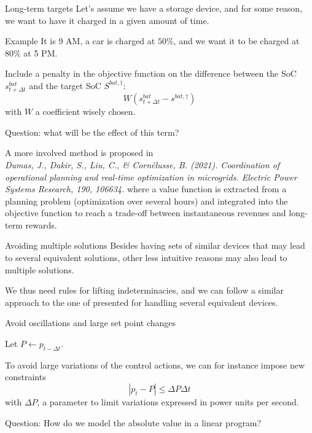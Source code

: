 \begin{frame}[allowframebreaks]{Long-term targets}
    Let's assume we have a storage device, and for some reason, we want to have it charged in a given amount of time.
    \begin{block}{Example}
        It is 9 AM, a car is charged at $50\%$, and we want it to be charged at $80\%$ at 5 PM.
    \end{block}

    Include a penalty in the objective function on the difference between the SoC $s^{bat}_{t+\Delta t}$ and the target SoC $S^{bat, \dagger}$:
    $$W (s^{bat}_{t+\Delta t} - s^{bat, \dagger})$$
    with $W$ a coefficient wisely chosen.

    Question: what will be the effect of this term?

    A more involved method is proposed in \\
    \textit{Dumas, J., Dakir, S., Liu, C., \& Cornélusse, B. (2021). Coordination of operational planning and real-time optimization in microgrids. Electric Power Systems Research, 190, 106634.}
    where a value function is extracted from a planning problem (optimization over several hours) and integrated into the objective function to reach a trade-off between instantaneous revenues and long-term rewards.
\end{frame}




\begin{frame}{Avoiding multiple solutions}
    Besides having sets of similar devices that may lead to several equivalent solutions, other less intuitive reasons may also lead to multiple solutions.

    We thus need rules for lifting indeterminacies, and we can follow a similar approach to the one of presented for handling several equivalent devices.
\end{frame}

\begin{frame} {Avoid oscillations and large set point changes} 

    Let $P \leftarrow p_{t-\Delta t}$.
    
    To avoid large variations of the control actions, we can for instance impose new constraints 
    $$| p_t - P| \leq \Delta P \Delta t$$
    with $\Delta P$, a parameter to limit variations expressed in power units per second.

    Question: How do we model the absolute value in a linear program?
\end{frame}



